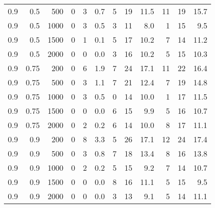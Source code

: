 \documentclass[a4paper, 12pt]{extreport}
\begin{document}
\begin{longtable}{|r|r|r|r|r|r|r|r|r|r|r|r|}
0.9 & 0.5 & 500 & 0 & 3 & 0.7 & 5 & 19 & 11.5 & 11 & 19 & 15.7 \\ 
0.9 & 0.5 & 1000 & 0 & 3 & 0.5 & 3 & 11 & 8.0 & 1 & 15 & 9.5 \\ 
0.9 & 0.5 & 1500 & 0 & 1 & 0.1 & 5 & 17 & 10.2 & 7 & 14 & 11.2 \\ 
0.9 & 0.5 & 2000 & 0 & 0 & 0.0 & 3 & 16 & 10.2 & 5 & 15 & 10.3 \\ 
\hline
0.9 & 0.75 & 200 & 0 & 6 & 1.9 & 7 & 24 & 17.1 & 11 & 22 & 16.4 \\ 
0.9 & 0.75 & 500 & 0 & 3 & 1.1 & 7 & 21 & 12.4 & 7 & 19 & 14.8 \\ 
0.9 & 0.75 & 1000 & 0 & 3 & 0.5 & 0 & 14 & 10.0 & 1 & 17 & 11.5 \\ 
0.9 & 0.75 & 1500 & 0 & 0 & 0.0 & 6 & 15 & 9.9 & 5 & 16 & 10.7 \\ 
0.9 & 0.75 & 2000 & 0 & 2 & 0.2 & 6 & 14 & 10.0 & 8 & 17 & 11.1 \\ 
\hline
0.9 & 0.9 & 200 & 0 & 8 & 3.3 & 5 & 26 & 17.1 & 12 & 24 & 17.4 \\ 
0.9 & 0.9 & 500 & 0 & 3 & 0.8 & 7 & 18 & 13.4 & 8 & 16 & 13.8 \\ 
0.9 & 0.9 & 1000 & 0 & 2 & 0.2 & 5 & 15 & 9.2 & 7 & 14 & 10.7 \\ 
0.9 & 0.9 & 1500 & 0 & 0 & 0.0 & 8 & 16 & 11.1 & 5 & 15 & 9.5 \\ 
0.9 & 0.9 & 2000 & 0 & 0 & 0.0 & 3 & 13 & 9.1 & 5 & 14 & 11.1 \\ 
\hline
\end{longtable}
\end{document}
